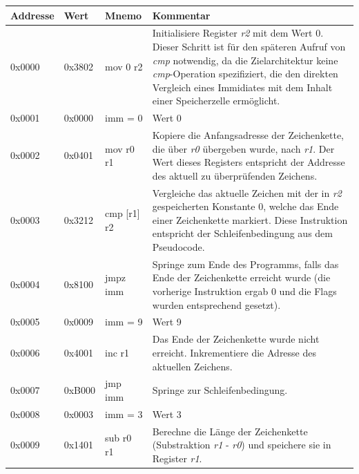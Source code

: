 \documentclass[12pt,a4paper]{article}
\begin{document}
\begin{adjustwidth}{0cm}{}
\begin{center}
  \begin{longtable}{|p{2cm}|p{2cm}|p{2cm}|p{10.7cm}|}
  	\hline
    Addresse & Wert & Mnemo & Kommentar \\
    
    \hline
    0x0000 & 0x3802 & mov 0 r2 & Initialisiere Register \emph{r2} mit dem Wert 0. Dieser Schritt ist für den späteren Aufruf von \emph{cmp} notwendig, da die Zielarchitektur keine \emph{cmp}-Operation spezifiziert, die den direkten Vergleich eines Immidiates mit dem Inhalt einer Speicherzelle ermöglicht. \\
    
    \hline
    0x0001 & 0x0000 & imm = 0 & Wert 0 \\
    
    \hline
    0x0002 & 0x0401 & mov r0 r1 & Kopiere die Anfangsadresse der Zeichenkette, die über \emph{r0} übergeben wurde, nach \emph{r1}. Der Wert dieses Registers entspricht der Addresse des aktuell zu überprüfenden Zeichens. \\
    
    \hline
    0x0003 & 0x3212 & cmp [r1] r2 & Vergleiche das aktuelle Zeichen mit der in \emph{r2} gespeicherten Konstante 0, welche das Ende einer Zeichenkette markiert. Diese Instruktion entspricht der Schleifenbedingung aus dem Pseudocode.\\
    
    \hline
    0x0004 & 0x8100 & jmpz imm & Springe zum Ende des Programms, falls das Ende der Zeichenkette erreicht wurde (die vorherige Instruktion ergab 0 und die Flags wurden entsprechend gesetzt). \\
    
    \hline
    0x0005 & 0x0009 & imm = 9 & Wert 9 \\
    
    \hline 
    0x0006 & 0x4001 & inc r1 & Das Ende der Zeichenkette wurde nicht erreicht. Inkrementiere die Adresse des aktuellen Zeichens. \\
    
    \hline 
    0x0007 & 0xB000 & jmp imm & Springe zur Schleifenbedingung. \\
    
    \hline
    0x0008 & 0x0003 & imm = 3 & Wert 3 \\
    
    \hline
    0x0009 & 0x1401 & sub r0 r1 & Berechne die Länge der Zeichenkette (Substraktion \emph{r1} - \emph{r0}) und speichere sie in Register \emph{r1}. \\
    
    \hline
    
  \end{longtable}
\end{center}
\end{adjustwidth}
\end{document}
